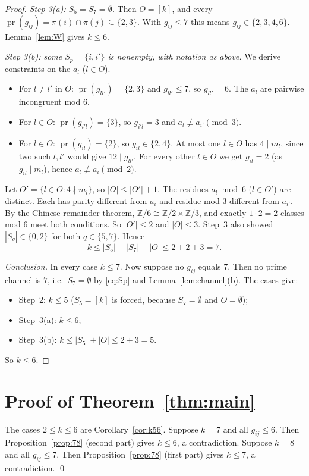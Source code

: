 \documentclass[11pt]{article}
\theoremstyle{remark}
\theoremstyle{definition}
\newcommand{\pr}{\operatorname{pr}}
\begin{document}
\begin{proof}
\emph{Step 3(a): $S_5=S_7=\emptyset$.} Then $O=[k]$, and every $\pr(g_{ij})=\pi(i)\cap\pi(j)\subseteq\{2,3\}$.
With $g_{ij}\le7$ this means $g_{ij}\in\{2,3,4,6\}$. Lemma~\ref{lem:W} gives $k\le6$.

\emph{Step 3(b): some $S_p=\{i,i'\}$ is nonempty, with notation as above.} We derive
constraints on the $a_l$ ($l\in O$).
\begin{itemize}
\item For $l\ne l'$ in $O$: $\pr(g_{ll'})=\{2,3\}$ and $g_{ll'}\le7$, so $g_{ll'}=6$. The $a_l$ are
  pairwise incongruent mod $6$.
\item For $l\in O$: $\pr(g_{i'l})=\{3\}$, so $g_{i'l}=3$ and $a_l\not\equiv a_{i'}\pmod3$.
\item For $l\in O$: $\pr(g_{il})=\{2\}$, so $g_{il}\in\{2,4\}$. At most one $l\in O$ has $4\mid m_l$, since
  two such $l,l'$ would give $12\mid g_{ll'}$. For every other $l\in O$ we get $g_{il}=2$ (as
  $g_{il}\mid m_l$), hence $a_l\not\equiv a_i\pmod2$.
\end{itemize}
Let $O'=\{l\in O:4\nmid m_l\}$, so $|O|\le|O'|+1$. The residues $a_l\bmod6$ ($l\in O'$) are distinct.
Each has parity different from $a_i$ and residue mod $3$ different from $a_{i'}$. By the Chinese
remainder theorem, $\mathbb{Z}/6\cong\mathbb{Z}/2\times\mathbb{Z}/3$, and exactly $1\cdot2=2$ classes
mod $6$ meet both conditions. So $|O'|\le2$ and $|O|\le3$. Step~3 also showed $|S_q|\in\{0,2\}$ for
both $q\in\{5,7\}$. Hence
\[
  k\le|S_5|+|S_7|+|O|\le2+2+3=7.
\]

\emph{Conclusion.} In every case $k\le7$. Now suppose no $g_{ij}$ equals $7$. Then no prime channel is
$7$, i.e.\ $S_7=\emptyset$ by \eqref{eq:Sp} and Lemma~\ref{lem:channel}(b). The cases give:
\begin{itemize}
\item Step~2: $k\le5$ ($S_5=[k]$ is forced, because $S_7=\emptyset$ and $O=\emptyset$);
\item Step~3(a): $k\le6$;
\item Step~3(b): $k\le|S_5|+|O|\le2+3=5$.
\end{itemize}
So $k\le6$.
\end{proof}

\section{Proof of Theorem~\ref{thm:main}}

The cases $2\le k\le6$ are Corollary~\ref{cor:k56}. Suppose $k=7$ and all $g_{ij}\le6$. Then
Proposition~\ref{prop:78} (second part) gives $k\le6$, a contradiction. Suppose $k=8$ and all
$g_{ij}\le7$. Then Proposition~\ref{prop:78} (first part) gives $k\le7$, a contradiction. \qed
\end{document}

